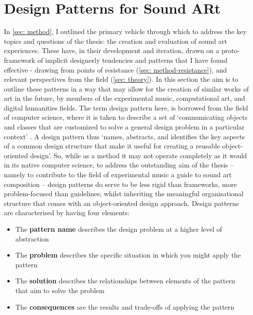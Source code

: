 \section{Design Patterns for Sound ARt}\label{sec: discussion-guidelines}
In \autoref{sec: method}, I outlined the primary vehicle through which to address the key topics and questions of the thesis: the creation and evaluation of sound \gls{art} experiences. These have, in their development and iteration, drawn on a proto-framework of implicit designerly tendencies and patterns that I have found effective - drawing from points of resistance (\autoref{sec: method-resistance}), and relevant perspectives from the field (\autoref{sec: theory}). In this section the aim is to outline these patterns in a way that may allow for the creation of similar works of \gls{art} in the future, by members of the experimental music, computational art, and digital humanities fields. The term design pattern here, is borrowed from the field of computer science, where it is taken to describe a set of `communicating objects and classes that are customized to solve a general design problem in a particular context' \citep{gamma1995}. A design pattern thus `names, abstracts, and identifies the key aspects of a common design structure that make it useful for creating a reusable object-oriented design'. So, while as a method it may not operate completely as it would in its native computer science, to address the outstanding aim of the thesis -- namely to contribute to the field of experimental music a guide to sound \gls{art} composition -- design patterns do serve to be less rigid than frameworks, more problem-focused than guidelines; whilst inheriting the meaningful organisational structure that comes with an object-oriented design approach. Design patterns are characterised by having four elements:
\begin{itemize}
    \item The \textbf{pattern name} describes the design problem at a higher level of abstraction
    \item The \textbf{problem} describes the specific situation in which you might apply the pattern
    \item The \textbf{solution} describes the relationships between elements of the pattern that aim to solve the problem
    \item The \textbf{consequences} are the results and trade-offs of applying the pattern
\end{itemize}

